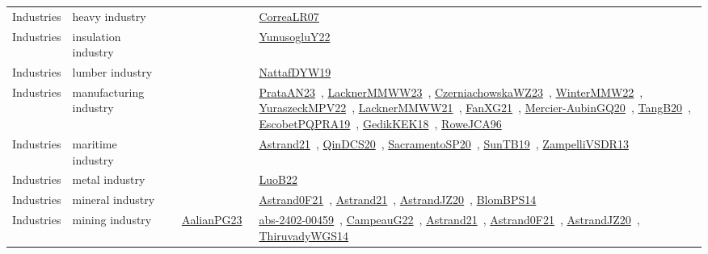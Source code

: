{\begin{longtable}{lp{3cm}>{\raggedright\arraybackslash}p{6cm}>{\raggedright\arraybackslash}p{6cm}>{\raggedright\arraybackslash}p{8cm}}
Industries & heavy industry &  &  & \href{../works/CorreaLR07.pdf}{CorreaLR07}~\cite{CorreaLR07}\\
Industries & insulation industry &  &  & \href{../works/YunusogluY22.pdf}{YunusogluY22}~\cite{YunusogluY22}\\
Industries & lumber industry &  &  & \href{../works/NattafDYW19.pdf}{NattafDYW19}~\cite{NattafDYW19}\\
Industries & manufacturing industry &  &  & \href{../works/PrataAN23.pdf}{PrataAN23}~\cite{PrataAN23}, \href{../works/LacknerMMWW23.pdf}{LacknerMMWW23}~\cite{LacknerMMWW23}, \href{../works/CzerniachowskaWZ23.pdf}{CzerniachowskaWZ23}~\cite{CzerniachowskaWZ23}, \href{../works/WinterMMW22.pdf}{WinterMMW22}~\cite{WinterMMW22}, \href{../works/YuraszeckMPV22.pdf}{YuraszeckMPV22}~\cite{YuraszeckMPV22}, \href{../works/LacknerMMWW21.pdf}{LacknerMMWW21}~\cite{LacknerMMWW21}, \href{../works/FanXG21.pdf}{FanXG21}~\cite{FanXG21}, \href{../works/Mercier-AubinGQ20.pdf}{Mercier-AubinGQ20}~\cite{Mercier-AubinGQ20}, \href{../works/TangB20.pdf}{TangB20}~\cite{TangB20}, \href{../works/EscobetPQPRA19.pdf}{EscobetPQPRA19}~\cite{EscobetPQPRA19}, \href{../works/GedikKEK18.pdf}{GedikKEK18}~\cite{GedikKEK18}, \href{../works/RoweJCA96.pdf}{RoweJCA96}~\cite{RoweJCA96}\\
Industries & maritime industry &  &  & \href{../works/Astrand21.pdf}{Astrand21}~\cite{Astrand21}, \href{../works/QinDCS20.pdf}{QinDCS20}~\cite{QinDCS20}, \href{../works/SacramentoSP20.pdf}{SacramentoSP20}~\cite{SacramentoSP20}, \href{../works/SunTB19.pdf}{SunTB19}~\cite{SunTB19}, \href{../works/ZampelliVSDR13.pdf}{ZampelliVSDR13}~\cite{ZampelliVSDR13}\\
Industries & metal industry &  &  & \href{../works/LuoB22.pdf}{LuoB22}~\cite{LuoB22}\\
Industries & mineral industry &  &  & \href{../works/Astrand0F21.pdf}{Astrand0F21}~\cite{Astrand0F21}, \href{../works/Astrand21.pdf}{Astrand21}~\cite{Astrand21}, \href{../works/AstrandJZ20.pdf}{AstrandJZ20}~\cite{AstrandJZ20}, \href{../works/BlomBPS14.pdf}{BlomBPS14}~\cite{BlomBPS14}\\
Industries & mining industry &  & \href{../works/AalianPG23.pdf}{AalianPG23}~\cite{AalianPG23} & \href{../works/abs-2402-00459.pdf}{abs-2402-00459}~\cite{abs-2402-00459}, \href{../works/CampeauG22.pdf}{CampeauG22}~\cite{CampeauG22}, \href{../works/Astrand21.pdf}{Astrand21}~\cite{Astrand21}, \href{../works/Astrand0F21.pdf}{Astrand0F21}~\cite{Astrand0F21}, \href{../works/AstrandJZ20.pdf}{AstrandJZ20}~\cite{AstrandJZ20}, \href{../works/ThiruvadyWGS14.pdf}{ThiruvadyWGS14}~\cite{ThiruvadyWGS14}\\

\end{longtable}}
